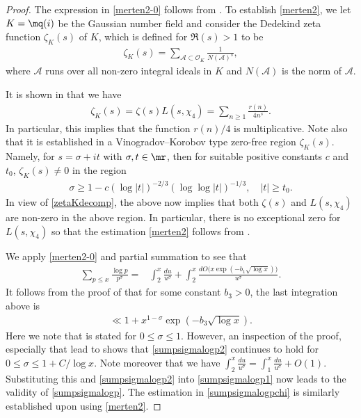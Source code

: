 \documentclass[twoside,leqno,10pt, A4]{amsart}
\begin{document}
\begin{proof}
  The expression in \eqref{merten2-0} follows from \cite[Theorem 6.9]{MVa1}. To establish \eqref{merten2}, we let $K=\mq(i)$ be the Gaussian number field and consider the Dedekind zeta function $\zeta_K(s)$ of $K$, which is defined for $\Re(s)>1$ to be
\begin{align*}
\zeta_K(s)=\sum_{\mathcal{A} \subset
  \mathcal{O}_K}\frac {1}{N(\mathcal{A})^{s}},
\end{align*}   
where $\mathcal{A}$ runs over all non-zero integral ideals in $K$ and $N(\mathcal{A})$ is the norm of $\mathcal{A}$. 

  It is shown in \cite[p. 17]{iwakow} that we have
\begin{align}
\label{zetaKdecomp}
\zeta_K(s)=\zeta(s)L(s,\chi_4)=\sum_{n \geq 1}\frac {r(n)}{4n^s}. 
\end{align}   
  In particular, this implies that the function $r(n)/4$ is multiplicative. 
  Note also that it is established in \cite{Sokolovskii68} a Vinogradov--Korobov type zero-free region $\zeta_K(s)$. Namely, for $s=\sigma+it$ with $\sigma, t \in \mr$, then for suitable positive constants $c$ and $t_0$, $\zeta_K(s) \neq 0$ in the region
\begin{align}
\label{zetaKzerofree}
 \sigma \geq 1-c(\log |t|)^{-2/3}(\log \log |t|)^{-1/3}, \quad |t| \geq t_0. 
\end{align}  
   In view of \eqref{zetaKdecomp}, the above now implies that both $\zeta(s)$ and $L(s,\chi_4)$ are non-zero in the above region. In particular, there is no exceptional zero for $L(s,\chi_4)$ so that the estimation \eqref{merten2} follows from \cite[(11.24)]{MVa1}. 
  
  We apply \eqref{merten2-0} and partial summation to see that
\begin{align}
\label{sumpsigmalogp1}
\sum_{p\le x} \frac{\log p}{p^{\sigma}} =& \int^x_2\frac {du}{u^{\sigma}}+ \int^x_2\frac {dO\Big(x \exp(-b_1\sqrt{\log x})\Big)}{u^{\sigma}}.
\end{align}  
  It follows from the proof of \cite[Lemma 7.3]{MVa1} that for some constant $b_3>0$, the last integration above is
\begin{align}
\label{sumpsigmalogp2}
 \ll 1+x^{1-\sigma}\exp(-b_3\sqrt{\log x}).
\end{align} 
  Here we note that \cite[Lemma 7.3]{MVa1} is stated for $0 \leq \sigma \leq 1$. However, an inspection of the proof, especially that lead to \cite[(7.19)]{MVa1} shows that \eqref{sumpsigmalogp2} continues to hold for $0 \leq \sigma \leq 1+C/\log x$. 
  Note moreover that we have $ \int^x_2\frac {du}{u^{\sigma}}=\int^x_1\frac {du}{u^{\sigma}}+O(1)$.  Substituting this and \eqref{sumpsigmalogp2} into \eqref{sumpsigmalogp1} now leads to the validity of \eqref{sumpsigmalogp}. The estimation in \eqref{sumpsigmalogpchi} is similarly established upon using \eqref{merten2}. 


\end{proof}
\end{document}
